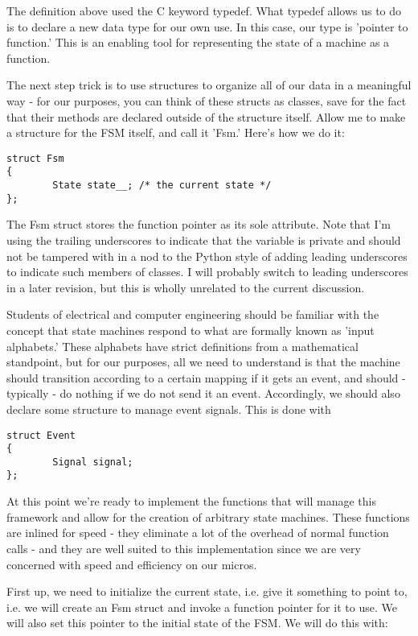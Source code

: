 The definition above used the C keyword typedef. What typedef allows us to do is to declare a new data type for our own use. In this case, our type is 'pointer to function.' This is an enabling tool for representing the state of a machine as a function.

The next step trick is to use structures to organize all of our data in a meaningful way - for our purposes, you can think of these structs as classes, save for the fact that their methods are declared outside of the structure itself. Allow me to make a structure for the FSM itself, and call it 'Fsm.' Here's how we do it:

\begin{lstlisting}
struct Fsm
{      
        State state__; /* the current state */
};
\end{lstlisting}

The Fsm struct stores the function pointer as its sole attribute. Note that I'm using the trailing underscores to indicate that the variable is private and should not be tampered with in a nod to the Python style of adding leading underscores to indicate such members of classes. I will probably switch to leading underscores in a later revision, but this is wholly unrelated to the current discussion.

Students of electrical and computer engineering should be familiar with the concept that state machines respond to what are formally known as 'input alphabets.' These alphabets have strict definitions from a mathematical standpoint, but for our purposes, all we need to understand is that the machine should transition according to a certain mapping if it gets an event, and should - typically - do nothing if we do not send it an event. Accordingly, we should also declare some structure to manage event signals. This is done with

\begin{lstlisting}
struct Event
{
        Signal signal;
};
\end{lstlisting}

At this point we're ready to implement the functions that will manage this framework and allow for the creation of arbitrary state machines. These functions are inlined for speed - they eliminate a lot of the overhead of normal function calls - and they are well suited to this implementation since we are very concerned with speed and efficiency on our micros.

First up, we need to initialize the current state, i.e. give it something to point to, i.e. we will create an Fsm struct and invoke a function pointer for it to use. We will also set this pointer to the initial state of the FSM. We will do this with:

